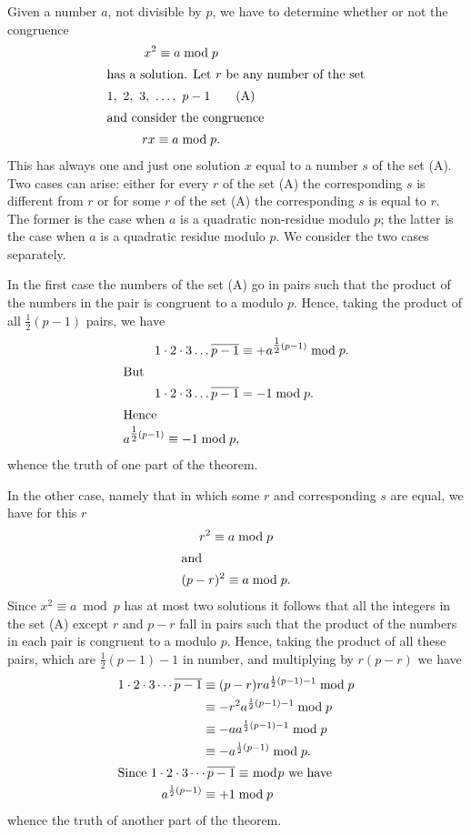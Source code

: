 \documentclass[oneside]{book}
\begin{document}
Given a number $a$, not divisible by $p$, we have to determine
whether or not the congruence
\begin{gather}
x^2 \equiv a \bmod p \notag \\
\intertext{has a solution. Let $r$ be any number of the set}
1,\ 2,\ 3,\ \ldots,\ p-1 \tag{A} \\
\intertext{and consider the congruence}
rx \equiv a \bmod p.
\end{gather}
This has always one and just one solution $x$ equal to a number $s$
of the set (A). Two cases can arise: either for every $r$ of the set
(A) the corresponding $s$ is different from $r$ or for some $r$ of
the set (A) the corresponding $s$ is equal to $r$. The former is the
case when $a$ is a quadratic non-residue modulo $p$; the latter is
the case when $a$ is a quadratic residue modulo $p$. We consider the
two cases separately.

In the first case the numbers of the set (A) go in pairs such that
the product of the numbers in the pair is congruent to a modulo $p$.
Hence, taking the product of all $\tfrac{1}{2}(p - 1)$ pairs, we
have
\begin{align*}
1 \cdot 2 \cdot 3 \ldots \overline{p-1} &\equiv
      +a^{\tfrac{1}{2}(p-1)} \bmod p. \\
\intertext{But}
1 \cdot 2 \cdot 3 \ldots \overline{p-1} &= -1 \bmod p. \\
\intertext{Hence}
a^{\tfrac{1}{2}(p-1)} \equiv -1 \bmod p,
\end{align*}
whence the truth of one part of the theorem.

In the other case, namely that in which some $r$ and corresponding
$s$ are equal, we have for this $r$
\begin{gather*}
r^{2} \equiv a \bmod p \\
\intertext{and}
(p - r)^{2} \equiv a \bmod p.
\end{gather*}
Since $x^{2} \equiv a \bmod p$ has at most two solutions it follows
that all the integers in the set (A) except $r$ and $p - r$ fall in
pairs such that the product of the numbers in each pair is congruent
to a modulo $p$. Hence, taking the product of all these pairs, which
are $\frac{1}{2}(p - 1) - 1$ in number, and multiplying by $r(p-r)$
we have
\begin{align*}
1 \cdot 2 \cdot 3 \cdots \overline{p -1}
   &\equiv (p - r) r a^{\frac{1}{2}(p -1) - 1} \bmod p  \\
   &\equiv -r^{2} a^{\frac{1}{2}(p -1) - 1}    \bmod p  \\
   &\equiv -a a^{\frac{1}{2}(p -1) - 1}        \bmod p  \\
   &\equiv -a^{\frac{1}{2}(p -1)}              \bmod p. \\
\intertext{Since $1 \cdot 2 \cdot 3 \cdots \overline{p - 1} \equiv
\bmod p$ we have}
a^{\frac{1}{2}(p -1)} &\equiv + 1 \bmod p
\end{align*}
whence the truth of another part of the theorem.
\end{document}
